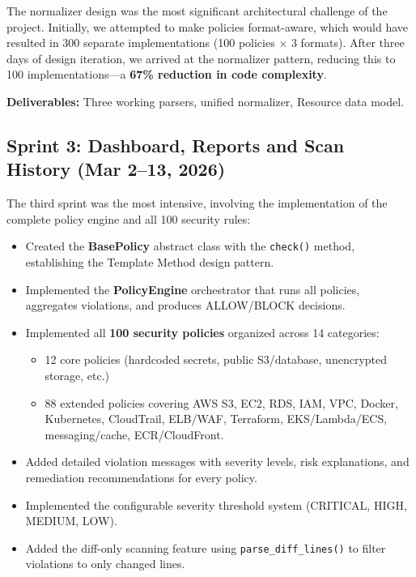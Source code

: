 The normalizer design was the most significant architectural challenge of the project. Initially, we attempted to make policies format-aware, which would have resulted in 300 separate implementations (100 policies $\times$ 3 formats). After three days of design iteration, we arrived at the normalizer pattern, reducing this to 100 implementations—a \textbf{67\% reduction in code complexity}.

\noindent\textbf{Deliverables:} Three working parsers, unified normalizer, Resource data model.


\subsection*{Sprint 3: Dashboard, Reports and Scan History (Mar 2--13, 2026)}

The third sprint was the most intensive, involving the implementation of the complete policy engine and all 100 security rules:

\begin{itemize}
    \item Created the \textbf{BasePolicy} abstract class with the \texttt{check()} method, establishing the Template Method design pattern.
    \item Implemented the \textbf{PolicyEngine} orchestrator that runs all policies, aggregates violations, and produces ALLOW/BLOCK decisions.
    \item Implemented all \textbf{100 security policies} organized across 14 categories:
    \begin{itemize}
        \item 12 core policies (hardcoded secrets, public S3/database, unencrypted storage, etc.)
        \item 88 extended policies covering AWS S3, EC2, RDS, IAM, VPC, Docker, Kubernetes, CloudTrail, ELB/WAF, Terraform, EKS/Lambda/ECS, messaging/cache, ECR/CloudFront.
    \end{itemize}
    \item Added detailed violation messages with severity levels, risk explanations, and remediation recommendations for every policy.
    \item Implemented the configurable severity threshold system (CRITICAL, HIGH, MEDIUM, LOW).
    \item Added the diff-only scanning feature using \texttt{parse\_diff\_lines()} to filter violations to only changed lines.
\end{itemize}

